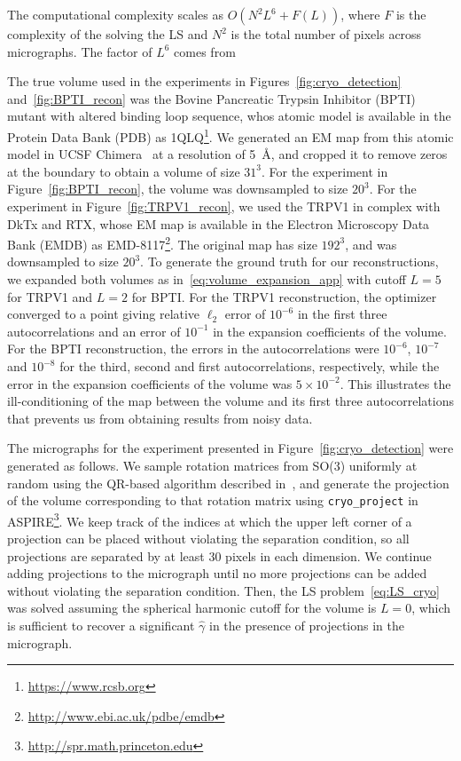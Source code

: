 \documentclass[9pt,twocolumn,twoside,lineno]{pnas-new}
\begin{document}
The computational complexity scales as $O(N^2L^6+ F(L))$, where $F$ is the complexity of the solving the LS and $N^2$ is the total number of pixels across micrographs. The factor of $L^6$ comes from  


The true volume used in the experiments in Figures~\ref{fig:cryo_detection} and~\ref{fig:BPTI_recon} was the Bovine Pancreatic Trypsin Inhibitor (BPTI) mutant with altered binding loop sequence, whos atomic model is available in the Protein Data Bank (PDB) %
as 1QLQ\footnote{\url{https://www.rcsb.org}}. We generated an EM map from this atomic model in UCSF Chimera~\cite{pettersen2004ucsf} at a resolution of 5~\AA, and cropped it to remove zeros at the boundary to obtain a volume of size $31^3$. For the experiment in Figure~\ref{fig:BPTI_recon}, the volume was downsampled to size $20^3$. For the experiment in Figure~\ref{fig:TRPV1_recon}, we used the TRPV1 in complex with DkTx and RTX, whose EM map is available in the  Electron Microscopy Data Bank (EMDB) %
as EMD-8117\footnote{\url{http://www.ebi.ac.uk/pdbe/emdb}}. The original map has size $192^3$, and was downsampled to size $20^3$. To generate the ground truth for our reconstructions, we expanded both volumes as in~\eqref{eq:volume_expansion_app} with cutoff $L = 5$ for TRPV1 and $L = 2$ for BPTI. For the TRPV1 reconstruction, the optimizer converged to a point giving relative $\ell_2$ error of $10^{-6}$ in the first three autocorrelations and an error of $10^{-1}$ in the expansion coefficients of the volume. For the BPTI reconstruction, the errors in the autocorrelations were $10^{-6}$, $10^{-7}$ and $10^{-8}$ for the third, second and first autocorrelations, respectively, while the error in the expansion coefficients of the volume was $5\times 10^{-2}$. This illustrates the ill-conditioning of the map between the volume and its first three autocorrelations that prevents us from obtaining results from noisy data.

The micrographs for the experiment presented in Figure~\ref{fig:cryo_detection} were generated as follows. We sample rotation matrices from SO(3) uniformly at random using the QR-based algorithm described in~\cite{stewart1980efficient}, and generate the projection of the volume corresponding to that rotation matrix using \verb|cryo_project| in ASPIRE\footnote{\url{http://spr.math.princeton.edu}}. %
 We keep track of the indices at which the upper left corner of a projection can be placed without violating the separation condition, so all projections are separated by at least 30 pixels in each dimension. We continue adding projections to the micrograph until no more projections can be added without violating the separation condition.  Then, the LS problem~\eqref{eq:LS_cryo} was solved assuming the spherical harmonic cutoff for the volume is $L=0$, which is sufficient to recover a significant $\widehat\gamma$ in the presence of projections in the micrograph.
\end{document}
